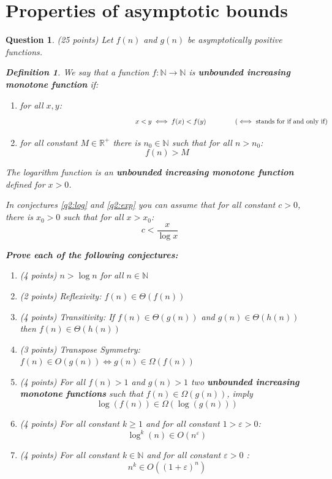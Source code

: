 \documentclass[a4paper]{article}
\theoremstyle{remarksStyle}
\newtheorem*{definition}{Definition}
\theoremstyle{questionStyle}
\newtheorem{question}{Question}
\theoremstyle{answerStyle}
\begin{document}
\section {Properties of asymptotic bounds}
\begin{question} (25 points) \label{q2}
Let $f(n)$ and $g(n)$ be asymptotically positive functions.

\begin{definition}
    We say that a function $f: \mathbb{N} \to \mathbb{N}$ is \textbf{unbounded increasing monotone function} if:
    \begin{enumerate}
        \item for all $x,y$:
        \[\text{\hspace{6cm}}x < y \iff f(x) < f(y) \text{\hspace{1.4cm} ($\iff$ stands for if and only if)}\]

        
        \item for all constant $M\in \mathbb{R}^+$ there is $n_0 \in \mathbb{N}$ such that for all $n > n_0$:
        \[f(n) > M\]
    \end{enumerate}
\end{definition}

\begin{boxxed}
    \textcolor{CB_blue}{
    The logarithm function is an \textbf{unbounded increasing monotone function} defined for $x > 0$.}
\end{boxxed}

\begin{boxxed}
    \textcolor{CB_blue}{
    In conjectures \ref{q2:log} and \ref{q2:exp} you can assume that for all constant $c > 0$, there is $x_0 > 0$ such that for all $x > x_0$: \[c < \frac{x}{\log x}\]}
\end{boxxed}

\vspace{1ex}
\textbf{Prove each of the following conjectures:}

\begin{enumerate}
    \item (4 points) $n > \log n $ for all $n \in \mathbb{N}$
    \item (2 points) Reflexivity: $f(n) \in \Theta(f(n))$
    \item (4 points) Transitivity: If $f(n) \in \Theta(g(n))$ and $g(n) \in \Theta(h(n))$ then $f(n) \in \Theta(h(n))$
    \item (3 points) Transpose Symmetry: $f(n) \in O(g(n)) \iff g(n) \in \Omega(f(n))$
    \item (4 points) For all $f(n) > 1$ and $g(n) > 1$ two \textbf{\textcolor{Bittersweet}{unbounded increasing monotone functions}} such that $f(n) \in \Omega(g(n))$, imply \[\log (f(n)) \in \Omega(\log (g(n)))\]

    \item (4 points) \label{q2:log} For all constant $k \ge 1$ and for all constant $1 > \varepsilon > 0$:
    \[ \log^k (n) \in O (n^\varepsilon) \]
    \item (4 points) \label{q2:exp} For all constant $k \in \mathbb{N}$ and for all constant $\varepsilon > 0$ :
    \[n^k \in O( (1 + \varepsilon)^n)\]
\end{enumerate}
\end{question}
\end{document}
